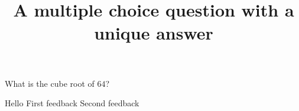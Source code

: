 \documentclass{webquiz}
\title{A multiple choice question with a unique answer}
\begin{document}
  \begin{question}     %
     What is the cube root of $64$?
     \begin{choice}[columns=3]%
         \correct Hello
         \feedback First feedback
         \feedback Second feedback
     \end{choice}
  \end{question}
\end{document}
